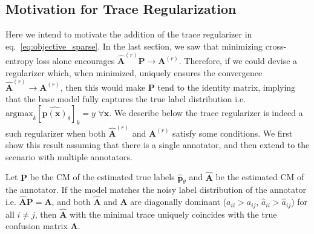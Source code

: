 \clearpage
\subsection{Motivation for Trace Regularization}\label{sec:theorems}
Here we intend to motivate the addition of the trace regularizer in eq.~\ref{eq:objective_sparse}. In the last section, we saw that minimizing cross-entropy loss alone encourages $\hat{\textbf{A}}^{(r)}\textbf{P}\rightarrow \textbf{A}^{(r)}$. Therefore, if we could devise a regularizer which, when minimized, uniquely ensures the convergence $\hat{\textbf{A}}^{(r)}\rightarrow\textbf{A}^{(r)}$, then this would make $\textbf{P}$ tend to the identity matrix, implying that the base model fully captures the true label distribution i.e. $\text{argmax}_{k}[\hat{\textbf{p}(\mathbf{x})}_{\theta}]_{k} =  y\,\, \forall \mathbf{x}$. We describe below the trace regularizer is indeed a such regularizer when both $\hat{\mathbf{A}}^{(r)}$ and $\mathbf{A}^{(r)}$ satisfy some conditions. We first show this result assuming that there is a single annotator, and then extend to the scenario with multiple annotators.  

\begin{lemma}
\label{lemma:1}
Let $\textbf{P}$ be the CM of the estimated true labels $\hat{\textbf{p}}_{\theta}$ and $\hat{\textbf{A}}$ be the estimated CM of the annotator. If the model matches the noisy label distribution of the annotator i.e. $\hat{\textbf{A}}\textbf{P}=\textbf{A} $, and both $\hat{\textbf{A}}$ and $\textbf{A}$ are diagonally dominant ($a_{ii} > a_{ij}$, $\hat{a}_{ii} > \hat{a}_{ij}$) for all $i \neq j$, then $\hat{\textbf{A}}$ with the minimal trace uniquely coincides with the true confusion matrix $\textbf{A}$. %
\end{lemma}

